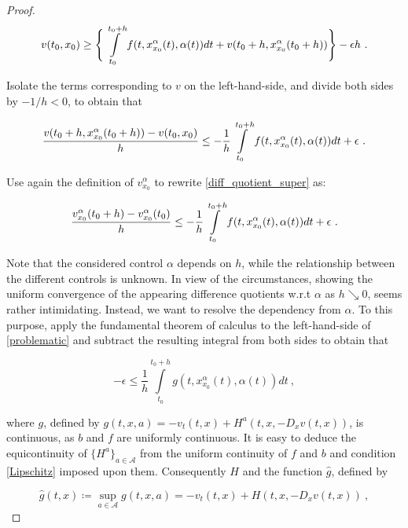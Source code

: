 \begin{theorem}
\begin{proof}
		\begin{equation*}
			v(t_0, x_0) \geq \Bigg\{ \pathint{\alpha}{t_0}{t_0 + h} + v(t_0 + h, x^{\alpha}_{x_0}(t_0 + h)) \Bigg\} - \epsilon h \ .
		\end{equation*}
		
		Isolate the terms corresponding to $ v $ on the left-hand-side, and divide both sides by $ -1 / h < 0 $, to obtain that
		
		\begin{equation}
			\label{diff_quotient_super}
			\frac{v(t_0 + h, x^{\alpha}_{x_0}(t_0 + h)) - v(t_0, x_0)}{h} \leq - \frac{1}{h} \pathint{\alpha}{t_0}{t_0 + h} + \epsilon \ .
		\end{equation}
		
		Use again the definition of $ v^{\alpha}_{x_0} $ to rewrite \ref{diff_quotient_super} as:
		
		\begin{equation}
		\label{problematic}
			\frac{v^{\alpha}_{x_0}(t_0 + h) - v^{\alpha}_{x_0}(t_0)}{h} \leq - \frac{1}{h} \pathint{\alpha}{t_0}{t_0 + h} + \epsilon \ .
		\end{equation}
		
		Note that the considered control $ \alpha $ depends on $ h $, while the relationship between the different controls is unknown. In view of the circumstances, showing the uniform convergence of the appearing difference quotients w.r.t $ \alpha $ as $ h \searrow 0 $, seems rather intimidating. Instead, we want to resolve the dependency from $ \alpha $. To this purpose, apply the fundamental theorem of calculus to the left-hand-side of \ref{problematic} and subtract the resulting integral from both sides to obtain that
		
		\begin{equation}
			\label{resolve}
			- \epsilon \leq \frac{1}{h} \int\limits^{t_0 + h}_{t_0} g(t, x^{\alpha}_{x_0}(t), \alpha(t)) dt \ ,
		\end{equation}
		
		where $ g $, defined by $ g(t, x, a) = - v_t(t, x) + H^{a}(t, x, -D_x v(t, x)) $, is continuous, as $ b $ and $ f $ are uniformly continuous. It is easy to deduce the equicontinuity of $ \{ H^{a} \}_{a \in \mathcal{A}}  $ from the uniform continuity of $ f $ and $ b $ and condition \ref{Lipschitz} imposed upon them. Consequently $ H $ and the function $ \hat{g} $, defined by
		
		\begin{equation*}
			\hat{g}(t, x) \coloneqq \sup\limits_{a \in \mathcal{A}} g(t, x, a) = -v_t(t, x) + H(t, x, -D_x v(t, x)) \ ,
		\end{equation*}
		

\end{proof}
\end{theorem}
